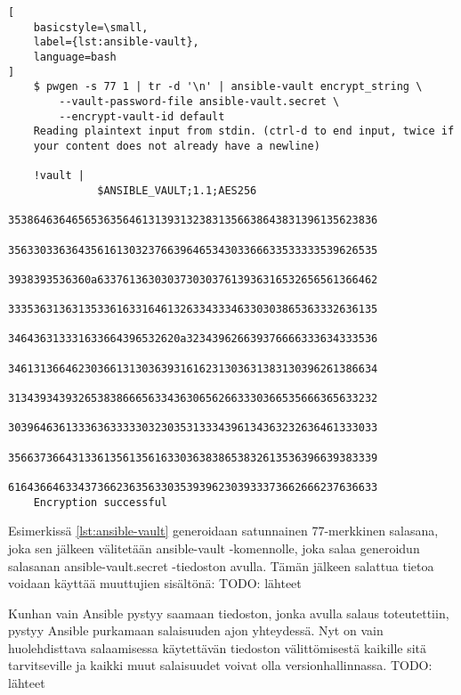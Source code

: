 \begin{lstlisting}[
    basicstyle=\small,
    label={lst:ansible-vault},
    language=bash
]
    $ pwgen -s 77 1 | tr -d '\n' | ansible-vault encrypt_string \
        --vault-password-file ansible-vault.secret \
        --encrypt-vault-id default
    Reading plaintext input from stdin. (ctrl-d to end input, twice if
    your content does not already have a newline)

    !vault |
              $ANSIBLE_VAULT;1.1;AES256
              3538646364656536356461313931323831356638643831396135623836
              3563303363643561613032376639646534303366633533333539626535
              3938393536360a63376136303037303037613936316532656561366462
              3335363136313533616331646132633433346330303865363332636135
              346436313331633664396532620a323439626639376666333634333536
              3461313664623036613130363931616231303631383130396261386634
              3134393439326538386665633436306562663330366535666365633232
              3039646361333636333330323035313334396134363232636461333033
              3566373664313361356135616330363838653832613536396639383339
              6164366463343736623635633035393962303933373662666237636633
    Encryption successful

\end{lstlisting}

Esimerkissä \ref{lst:ansible-vault} generoidaan satunnainen 77-merkkinen salasana,
joka sen jälkeen välitetään ansible-vault -komennolle, joka salaa generoidun
salasanan ansible-vault.secret -tiedoston avulla. Tämän jälkeen salattua tietoa
voidaan käyttää muuttujien sisältönä:
TODO: lähteet



Kunhan vain Ansible pystyy saamaan tiedoston, jonka avulla salaus toteutettiin,
pystyy Ansible purkamaan salaisuuden ajon yhteydessä. Nyt on vain huolehdisttava
salaamisessa käytettävän tiedoston välittömisestä kaikille sitä tarvitseville ja
kaikki muut salaisuudet voivat olla versionhallinnassa.
TODO: lähteet
